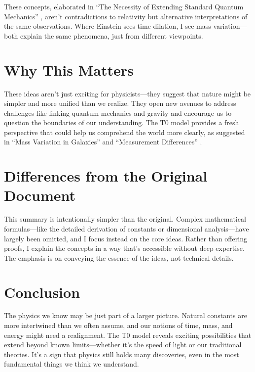 \documentclass[a4paper,12pt]{article}
\begin{document}
	These concepts, elaborated in “The Necessity of Extending Standard Quantum Mechanics” \cite{pascher_quantum_2025}, aren’t contradictions to relativity but alternative interpretations of the same observations. Where Einstein sees time dilation, I see mass variation—both explain the same phenomena, just from different viewpoints.
	
	\section{Why This Matters}
	
	These ideas aren’t just exciting for physicists—they suggest that nature might be simpler and more unified than we realize. They open new avenues to address challenges like linking quantum mechanics and gravity and encourage us to question the boundaries of our understanding. The T0 model provides a fresh perspective that could help us comprehend the world more clearly, as suggested in “Mass Variation in Galaxies” \cite{pascher_galaxies_2025} and “Measurement Differences” \cite{pascher_messdifferenzen_2025}.
	
	\section{Differences from the Original Document}
	
	This summary is intentionally simpler than the original. Complex mathematical formulas—like the detailed derivation of constants or dimensional analysis—have largely been omitted, and I focus instead on the core ideas. Rather than offering proofs, I explain the concepts in a way that’s accessible without deep expertise. The emphasis is on conveying the essence of the ideas, not technical details.
	
	\section{Conclusion}
	
	The physics we know may be just part of a larger picture. Natural constants are more intertwined than we often assume, and our notions of time, mass, and energy might need a realignment. The T0 model reveals exciting possibilities that extend beyond known limits—whether it’s the speed of light or our traditional theories. It’s a sign that physics still holds many discoveries, even in the most fundamental things we think we understand.
	
\end{document}
